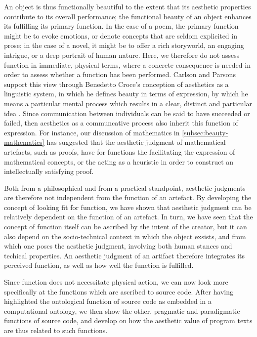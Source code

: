 An object is thus functionally beautiful to the extent that its aesthetic properties contribute to its overall performance; the functional beauty of an object enhances its fulfilling its primary function. In the case of a poem, the primary function might be to evoke emotions, or denote concepts that are seldom explicited in prose; in the case of a novel, it might be to offer a rich storyworld, an engaging intrigue, or a deep portrait of human nature. Here, we therefore do not assess function in immediate, physical terms, where a concrete consequence is needed in order to assess whether a function has been performed. Carlson and Parsons support this view through Benedetto Croce's conception of aesthetics as a linguistic system, in which he defines beauty in terms of expression, by which he means a particular mental process which results in a clear, distinct and particular idea \citep{parsons_functional_2012}. Since communication between individuals can be said to have succeeded or failed, then aesthetics as a communcative process also inherit this function of expression. For instance, our discussion of mathematics in \ref{subsec:beauty-mathematics} has suggested that the aesthetic judgment of mathematical artefacts, such as proofs, have for functions the facilitating the expression of mathematical concepts, or the acting as a heuristic in order to construct an intellectually satisfying proof. 

Both from a philosophical and from a practical standpoint, aesthetic judgments are therefore not independent from the function of an artefact. By developing the concept of looking fit for function, we have shown that aesthetic judgment can be relatively dependent on the function of an artefact. In turn, we have seen that the concept of function itself can be ascribed by the intent of the creator, but it can also depend on the socio-technical context in which the object exsists, and from which one poses the aesthetic judgment, involving both human stances and techical properties. An aesthetic judgment of an artifact therefore integrates its perceived function, as well as how well the function is fulfilled. 

Since function does not necessitate physical action, we can now look more specifically at the functions which are ascribed to source code. After having highlighted the ontological function of source code as embedded in a computational ontology, we then show the other, pragmatic and paradigmatic functions of source code, and develop on how the aesthetic value of program texts are thus related to such functions.

